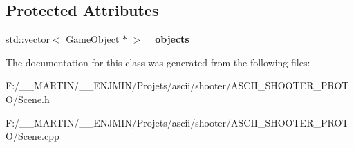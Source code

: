 \subsection*{Protected Attributes}
\begin{DoxyCompactItemize}
\item 
\hypertarget{class_scene_a08d7cc1bd05adcaedf8d264c8b9a3da2}{}\label{class_scene_a08d7cc1bd05adcaedf8d264c8b9a3da2} 
std\+::vector$<$ \hyperlink{class_game_object}{Game\+Object} $\ast$ $>$ {\bfseries \+\_\+objects}
\end{DoxyCompactItemize}


The documentation for this class was generated from the following files\+:\begin{DoxyCompactItemize}
\item 
F\+:/\+\_\+\+\_\+\+M\+A\+R\+T\+I\+N/\+\_\+\+\_\+\+E\+N\+J\+M\+I\+N/\+Projets/ascii/shooter/\+A\+S\+C\+I\+I\+\_\+\+S\+H\+O\+O\+T\+E\+R\+\_\+\+P\+R\+O\+T\+O/Scene.\+h\item 
F\+:/\+\_\+\+\_\+\+M\+A\+R\+T\+I\+N/\+\_\+\+\_\+\+E\+N\+J\+M\+I\+N/\+Projets/ascii/shooter/\+A\+S\+C\+I\+I\+\_\+\+S\+H\+O\+O\+T\+E\+R\+\_\+\+P\+R\+O\+T\+O/Scene.\+cpp\end{DoxyCompactItemize}

